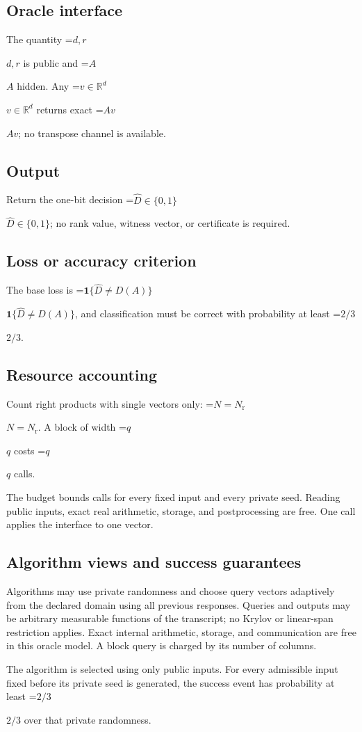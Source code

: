 \documentclass[10pt,a4paper]{article}
\newcommand{\AtlasMath}[1]{\par\begingroup\centering\setbox0=\hbox{$\displaystyle #1$}\ifdim\wd0>1.4\linewidth\typeout{ATLAS WIDE FORMULA: \the\wd0}\fi\ifdim\wd0>\linewidth\resizebox{\linewidth}{!}{\box0}\else\box0\fi\par\endgroup}
\newcommand{\AtlasInlineMath}[1]{\begingroup\setbox0=\hbox{$#1$}\ifdim\wd0>.4\linewidth\endgroup\AtlasMath{#1}\else\endgroup$#1$\fi}
\begin{document}
\subsection{Oracle interface}
The quantity \AtlasInlineMath{d,r} is public and \AtlasInlineMath{A} hidden. Any \AtlasInlineMath{v\in\mathbb{R}^d} returns exact \AtlasInlineMath{Av}; no transpose channel is available.

\subsection{Output}
Return the one-bit decision \AtlasInlineMath{\widehat{D}\in\{0,1\}}; no rank value, witness vector, or certificate is required.

\subsection{Loss or accuracy criterion}
The base loss is \AtlasInlineMath{\mathbf1\{\widehat{D}\ne D(A)\}}, and classification must be correct with probability at least \AtlasInlineMath{2/3}.

\subsection{Resource accounting}
Count right products with single vectors only: \AtlasInlineMath{N=N_{\mathrm r}}. A block of width \AtlasInlineMath{q} costs \AtlasInlineMath{q} calls.

The budget bounds calls for every fixed input and every private seed. Reading public inputs, exact real arithmetic, storage, and postprocessing are free. One call applies the interface to one vector.

\subsection{Algorithm views and success guarantees}
Algorithms may use private randomness and choose query vectors adaptively from the declared domain using all previous responses. Queries and outputs may be arbitrary measurable functions of the transcript; no Krylov or linear-span restriction applies. Exact internal arithmetic, storage, and communication are free in this oracle model. A block query is charged by its number of columns.

The algorithm is selected using only public inputs. For every admissible input fixed before its private seed is generated, the success event has probability at least \AtlasInlineMath{2/3} over that private randomness.
\end{document}
